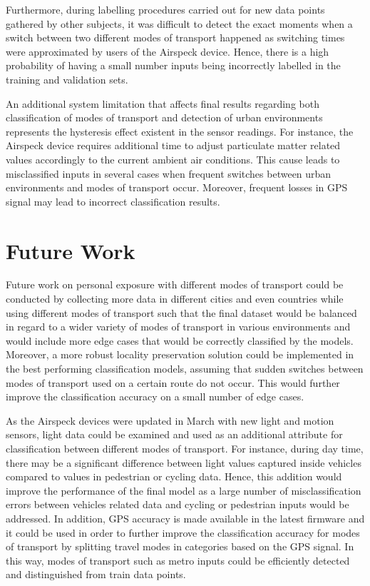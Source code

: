 \documentclass[bsc,frontabs,twoside,singlespacing, parskip,deptreport]{infthesis}     %
\begin{document}
Furthermore, during labelling procedures carried out for new data points gathered by other subjects, it was difficult to detect the exact moments when a switch between two different modes of transport happened as switching times were approximated by users of the Airspeck device. Hence, there is a high probability of having a small number inputs being incorrectly labelled in the training and validation sets.

An additional system limitation that affects final results regarding both classification of modes of transport and detection of urban environments represents the hysteresis effect existent in the sensor readings. For instance, the Airspeck device requires additional time to adjust particulate matter related values accordingly to the current ambient air conditions. This cause leads to misclassified inputs in several cases when frequent switches between urban environments and modes of transport occur. Moreover, frequent losses in GPS signal may lead to incorrect classification results.


\section{Future Work}

Future work on personal exposure with different modes of transport could be conducted by collecting more data in different cities and even countries while using different modes of transport such that the final dataset would be balanced in regard to a wider variety of modes of transport in various environments and would include more edge cases that would be correctly classified by the models. Moreover, a more robust locality preservation solution could be implemented in the best performing classification models, assuming that sudden switches between modes of transport used on a certain route do not occur. This would further improve the classification accuracy on a small number of edge cases.

As the Airspeck devices were updated in March with new light and motion sensors, light data could be examined and used as an additional attribute for classification between different modes of transport. For instance, during day time, there may be a significant difference between light values captured inside vehicles compared to values in pedestrian or cycling data. Hence, this addition would improve the performance of the final model as a large number of misclassification errors between vehicles related data and cycling or pedestrian inputs would be addressed. In addition, GPS accuracy is made available in the latest firmware and it could be used in order to further improve the classification accuracy for modes of transport by splitting travel modes in categories based on the GPS signal. In this way, modes of transport such as metro inputs could be efficiently detected and distinguished from train data points.
\end{document}
